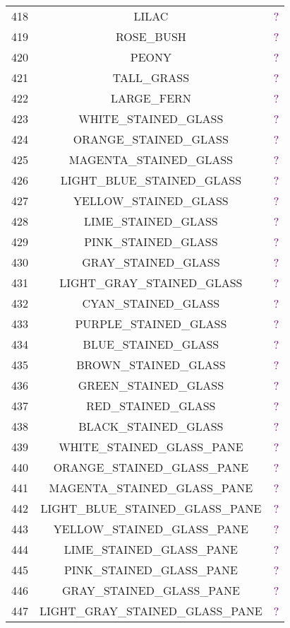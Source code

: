 \documentclass[11pt]{article}
\newcommand\myworries[1]{\textcolor{purple}{#1}}
\begin{document}
\begin{longtable}{ |c|c|c| }
	418 & LILAC & \myworries{?} \\
	419 & ROSE\_BUSH & \myworries{?} \\
	420 & PEONY & \myworries{?} \\
	421 & TALL\_GRASS & \myworries{?} \\
	422 & LARGE\_FERN & \myworries{?} \\
	423 & WHITE\_STAINED\_GLASS & \myworries{?} \\
	424 & ORANGE\_STAINED\_GLASS & \myworries{?} \\
	425 & MAGENTA\_STAINED\_GLASS & \myworries{?} \\
	426 & LIGHT\_BLUE\_STAINED\_GLASS & \myworries{?} \\
	427 & YELLOW\_STAINED\_GLASS & \myworries{?} \\
	428 & LIME\_STAINED\_GLASS & \myworries{?} \\
	429 & PINK\_STAINED\_GLASS & \myworries{?} \\
	430 & GRAY\_STAINED\_GLASS & \myworries{?} \\
	431 & LIGHT\_GRAY\_STAINED\_GLASS & \myworries{?} \\
	432 & CYAN\_STAINED\_GLASS & \myworries{?} \\
	433 & PURPLE\_STAINED\_GLASS & \myworries{?} \\
	434 & BLUE\_STAINED\_GLASS & \myworries{?} \\
	435 & BROWN\_STAINED\_GLASS & \myworries{?} \\
	436 & GREEN\_STAINED\_GLASS & \myworries{?} \\
	437 & RED\_STAINED\_GLASS & \myworries{?} \\
	438 & BLACK\_STAINED\_GLASS & \myworries{?} \\
	439 & WHITE\_STAINED\_GLASS\_PANE & \myworries{?} \\
	440 & ORANGE\_STAINED\_GLASS\_PANE & \myworries{?} \\
	441 & MAGENTA\_STAINED\_GLASS\_PANE & \myworries{?} \\
	442 & LIGHT\_BLUE\_STAINED\_GLASS\_PANE & \myworries{?} \\
	443 & YELLOW\_STAINED\_GLASS\_PANE & \myworries{?} \\
	444 & LIME\_STAINED\_GLASS\_PANE & \myworries{?} \\
	445 & PINK\_STAINED\_GLASS\_PANE & \myworries{?} \\
	446 & GRAY\_STAINED\_GLASS\_PANE & \myworries{?} \\
	447 & LIGHT\_GRAY\_STAINED\_GLASS\_PANE & \myworries{?} \\

\end{longtable}
\end{document}
